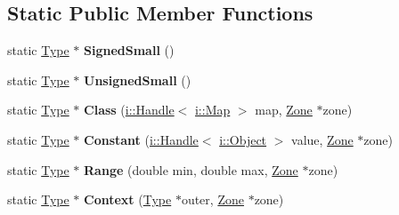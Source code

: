 \subsection*{Static Public Member Functions}
\begin{DoxyCompactItemize}
\item 
static \hyperlink{classv8_1_1internal_1_1_type}{Type} $\ast$ {\bfseries Signed\+Small} ()\hypertarget{classv8_1_1internal_1_1_type_a5eb691010f995144fe5e5b93c945851a}{}\label{classv8_1_1internal_1_1_type_a5eb691010f995144fe5e5b93c945851a}

\item 
static \hyperlink{classv8_1_1internal_1_1_type}{Type} $\ast$ {\bfseries Unsigned\+Small} ()\hypertarget{classv8_1_1internal_1_1_type_a511703ad8134efe438a6bd533e0f0eac}{}\label{classv8_1_1internal_1_1_type_a511703ad8134efe438a6bd533e0f0eac}

\item 
static \hyperlink{classv8_1_1internal_1_1_type}{Type} $\ast$ {\bfseries Class} (\hyperlink{classv8_1_1internal_1_1_handle}{i\+::\+Handle}$<$ \hyperlink{classv8_1_1internal_1_1_map}{i\+::\+Map} $>$ map, \hyperlink{classv8_1_1internal_1_1_zone}{Zone} $\ast$zone)\hypertarget{classv8_1_1internal_1_1_type_ae52b6a80053f170dd7ad1eccfe6d52fb}{}\label{classv8_1_1internal_1_1_type_ae52b6a80053f170dd7ad1eccfe6d52fb}

\item 
static \hyperlink{classv8_1_1internal_1_1_type}{Type} $\ast$ {\bfseries Constant} (\hyperlink{classv8_1_1internal_1_1_handle}{i\+::\+Handle}$<$ \hyperlink{classv8_1_1internal_1_1_object}{i\+::\+Object} $>$ value, \hyperlink{classv8_1_1internal_1_1_zone}{Zone} $\ast$zone)\hypertarget{classv8_1_1internal_1_1_type_ac42944d24551752a12f870d19dfe9264}{}\label{classv8_1_1internal_1_1_type_ac42944d24551752a12f870d19dfe9264}

\item 
static \hyperlink{classv8_1_1internal_1_1_type}{Type} $\ast$ {\bfseries Range} (double min, double max, \hyperlink{classv8_1_1internal_1_1_zone}{Zone} $\ast$zone)\hypertarget{classv8_1_1internal_1_1_type_a95908ac85fe72333097b9a96c45c6043}{}\label{classv8_1_1internal_1_1_type_a95908ac85fe72333097b9a96c45c6043}

\item 
static \hyperlink{classv8_1_1internal_1_1_type}{Type} $\ast$ {\bfseries Context} (\hyperlink{classv8_1_1internal_1_1_type}{Type} $\ast$outer, \hyperlink{classv8_1_1internal_1_1_zone}{Zone} $\ast$zone)\hypertarget{classv8_1_1internal_1_1_type_a22898484024706aab78b386c5b727912}{}\label{classv8_1_1internal_1_1_type_a22898484024706aab78b386c5b727912}


\end{DoxyCompactItemize}
